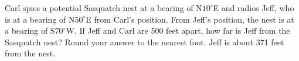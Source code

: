 { Carl spies a potential Sasquatch nest at a bearing of N$10^{\circ}$E and radios Jeff, who is at a bearing of N$50^{\circ}$E from Carl's position.  From Jeff's position, the nest is at a bearing of S$70^{\circ}$W. If Jeff and Carl are 500 feet apart, how far is Jeff from the Sasquatch nest?  Round your answer to the nearest foot.}
{Jeff is about 371 feet from the nest.}
